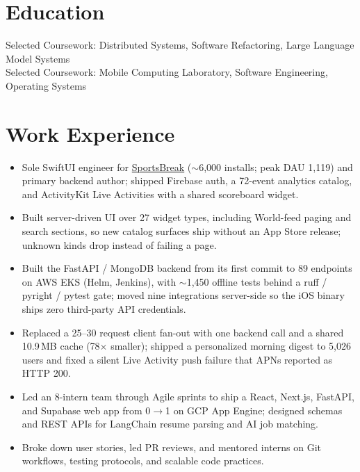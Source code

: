 \documentclass[11pt, letterpaper]{article}
\begin{document}

\section{Education}
Selected Coursework: Distributed Systems, Software Refactoring, Large Language Model Systems\\[1pt]
Selected Coursework: Mobile Computing Laboratory, Software Engineering, Operating Systems

\section{Work Experience}
\begin{itemize}
  \item Sole SwiftUI engineer for \href{https://apps.apple.com/app/id6762649287}{SportsBreak} ($\sim$6{,}000 installs; peak DAU 1{,}119) and primary backend author; shipped Firebase auth, a 72-event analytics catalog, and ActivityKit Live Activities with a shared scoreboard widget.
  \item Built server-driven UI over 27 widget types, including World-feed paging and search sections, so new catalog surfaces ship without an App Store release; unknown kinds drop instead of failing a page.
  \item Built the FastAPI / MongoDB backend from its first commit to 89 endpoints on AWS EKS (Helm, Jenkins), with $\sim$1{,}450 offline tests behind a ruff / pyright / pytest gate; moved nine integrations server-side so the iOS binary ships zero third-party API credentials.
  \item Replaced a 25--30 request client fan-out with one backend call and a shared 10.9\,MB cache (78$\times$ smaller); shipped a personalized morning digest to 5{,}026 users and fixed a silent Live Activity push failure that APNs reported as HTTP 200.
\end{itemize}

\begin{itemize}
  \item Led an 8-intern team through Agile sprints to ship a React, Next.js, FastAPI, and Supabase web app from 0$\to$1 on GCP App Engine; designed schemas and REST APIs for LangChain resume parsing and AI job matching.
  \item Broke down user stories, led PR reviews, and mentored interns on Git workflows, testing protocols, and scalable code practices.
\end{itemize}
\end{document}
